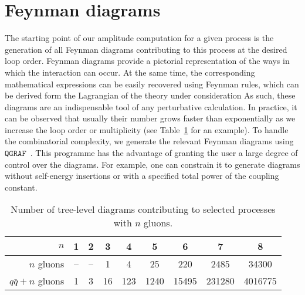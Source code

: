 \documentclass[main.tex]{subfiles}
\begin{document}
\section{Feynman diagrams}
The starting point of our amplitude computation for a given process is the generation of all Feynman diagrams contributing to this process at the desired loop order. Feynman diagrams provide a pictorial representation of the ways in which the interaction can occur.
At the same time, the corresponding mathematical expressions can be easily recovered using Feynman rules, which can be derived form the Lagrangian of the theory under consideration 
As such, these diagrams are an indispensable tool of any perturbative calculation. In practice, it can be observed that usually their number grows faster than exponentially as we increase the loop order or multiplicity (see Table~\ref{tab:ndiags} for an example). To handle the combinatorial complexity, we generate the relevant Feynman diagrams using $\texttt{QGRAF}$~\cite{Nogueira:1991ex}. This programme has the advantage of granting the user a large degree of control over the diagrams. For example, one can constrain it to generate diagrams without self-energy insertions or with a specified total power of the coupling constant. 
\begin{table}[b]
	\begin{center}
		\begin{tabular}{r|c|c|c|c|c|c|c|c}
			  $n$ & 1 & 2 & 3 & 4 & 5 & 6 & 7 & 8 \\
			\hline
			$n$ gluons   & -- & -- & 1 & 4 & 25 & 220 & 2485 & 34300 \\
			$q\bar{q} + n$ gluons & 1 & 3 & 16 & 123 & 1240 & 15495 & 231280 & 4016775 \\
		\end{tabular}
	\end{center}
 \caption{Number of tree-level diagrams contributing to selected processes with $n$ gluons.}
 \label{tab:ndiags}
\end{table}
\end{document}
